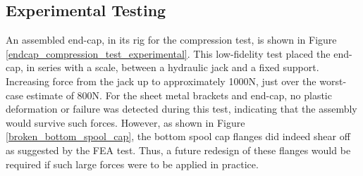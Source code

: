 \documentclass[12pt]{report}
\begin{document}


\subsection{Experimental Testing}



An assembled end-cap, in its rig for the compression test, is shown in Figure \ref{endcap_compression_test_experimental}.
This low-fidelity test placed the end-cap, in series with a scale, between a hydraulic jack and a fixed support.
Increasing force from the jack up to approximately 1000N, just over the worst-case estimate of 800N.
For the sheet metal brackets and end-cap, no plastic deformation or failure was detected during this test, indicating that the assembly would survive such forces.
However, as shown in Figure \ref{broken_bottom_spool_cap}, the bottom spool cap flanges did indeed shear off as suggested by the FEA test.
Thus, a future redesign of these flanges would be required if such large forces were to be applied in practice.
\end{document}
